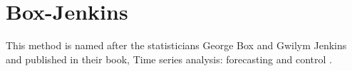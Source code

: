 
\section{Box-Jenkins}
This method is named after the statisticians George Box and Gwilym Jenkins and published in their book, Time series analysis: forecasting and control \cite{boxjenkins}.